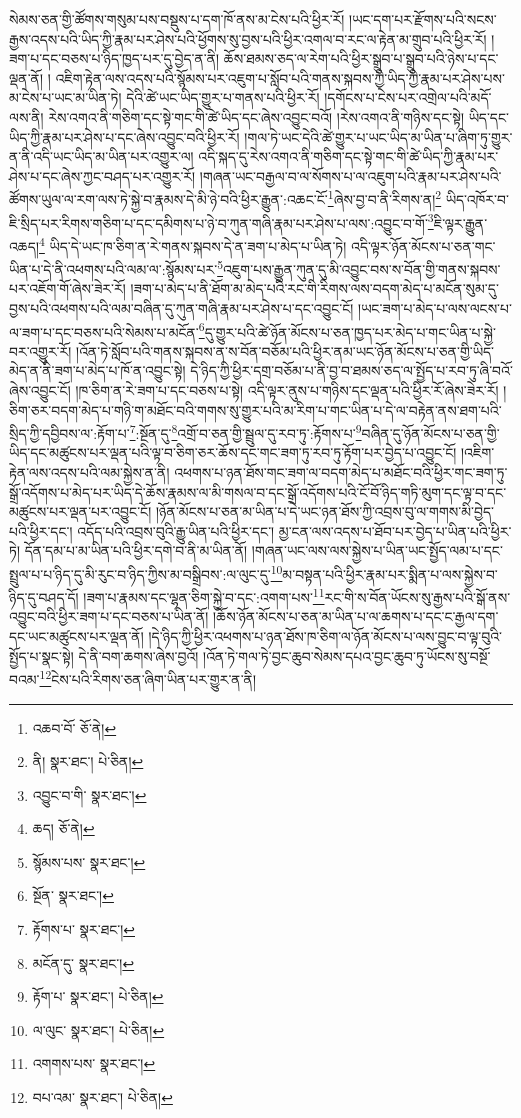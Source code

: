 སེམས་ཅན་གྱི་ཚོགས་གསུམ་པས་བསྡུས་པ་དག་ཁོ་ནས་མ་ངེས་པའི་ཕྱིར་རོ། །ཡང་དག་པར་རྫོགས་པའི་སངས་རྒྱས་འདས་པའི་ཡིད་ཀྱི་རྣམ་པར་ཤེས་པའི་ཕྱོགས་སུ་བྱས་པའི་ཕྱིར་འགལ་བ་རང་ལ་རྟེན་མ་གྲུབ་པའི་ཕྱིར་རོ། །ཟག་པ་དང་བཅས་པ་ཉིད་ཁྱད་པར་དུ་བྱེད་ན་ནི། ཆོས་ཐམས་ཅད་ལ་རེག་པའི་ཕྱིར་སྒྲུབ་པ་སྒྲུབ་པའི་ཉེས་པ་དང་ལྡན་ནོ། །
འཇིག་རྟེན་ལས་འདས་པའི་སྙོམས་པར་འཇུག་པ་སློབ་པའི་གནས་སྐབས་ཀྱི་ཡིད་ཀྱི་རྣམ་པར་ཤེས་པས་མ་ངེས་པ་ཡང་མ་ཡིན་ཏེ། དེའི་ཚེ་ཡང་ཡིད་གྱུར་པ་གནས་པའི་ཕྱིར་རོ། །དགོངས་པ་ངེས་པར་འགྲེལ་པའི་མདོ་ལས་ནི། རེས་འགའ་ནི་གཅིག་དང་སྟེ་གང་གི་ཚེ་ཡིད་དང་ཞེས་འབྱུང་བའོ། །རེས་འགའ་ནི་གཉིས་དང་སྟེ། ཡིད་དང་ཡིད་ཀྱི་རྣམ་པར་ཤེས་པ་དང་ཞེས་འབྱུང་བའི་ཕྱིར་རོ། །གལ་ཏེ་ཡང་དེའི་ཚེ་གྱུར་པ་ཡང་ཡིད་མ་ཡིན་པ་ཞིག་ཏུ་གྱུར་ན་ནི་འདི་ཡང་ཡིད་མ་ཡིན་པར་འགྱུར་ལ། འདི་སྐད་དུ་རེས་འགའ་ནི་གཅིག་དང་སྟེ་གང་གི་ཚེ་ཡིད་ཀྱི་རྣམ་པར་ཤེས་པ་དང་ཞེས་ཀྱང་བཤད་པར་འགྱུར་རོ། །གཞན་ཡང་བརྒྱལ་བ་ལ་སོགས་པ་ལ་འཇུག་པའི་རྣམ་པར་ཤེས་པའི་ཚོགས་ཡུལ་ལ་རག་ལས་ཏེ་སྐྱེ་བ་རྣམས་དེ་མི་ཉེ་བའི་ཕྱིར་རྒྱུན་:འཆང་ངོ་\footnote{འཆབ་བོ་  ཅོ་ནེ། }ཞེས་བྱ་བ་ནི་རིགས་ན།\footnote{ནི།  སྣར་ཐང་།  པེ་ཅིན། } ཡིད་འཁོར་བ་ཇི་སྲིད་པར་རིགས་གཅིག་པ་དང་དམིགས་པ་ཉེ་བ་ཀུན་གཞི་རྣམ་པར་ཤེས་པ་ལས་:འབྱུང་བ་གོ་\footnote{འབྱུང་བ་གི་  སྣར་ཐང་། }ཇི་ལྟར་རྒྱུན་འཆད།\footnote{ཆད།  ཅོ་ནེ། } ཡིད་དེ་ཡང་ཁ་ཅིག་ན་རེ་གནས་སྐབས་དེ་ན་ཟག་པ་མེད་པ་ཡིན་ཏེ། འདི་ལྟར་ཉོན་མོངས་པ་ཅན་གང་ཡིན་པ་དེ་ནི་འཕགས་པའི་ལམ་ལ་:སྙོམས་པར་\footnote{སྙོམས་པས་  སྣར་ཐང་། }འཇུག་པས་རྒྱུན་ཀུན་དུ་མི་འབྱུང་བས་ས་བོན་གྱི་གནས་སྐབས་པར་འཇོག་གོ་ཞེས་ཟེར་རོ། །ཟག་པ་མེད་པ་ནི་ཐོག་མ་མེད་པའི་རང་གི་རིགས་ལས་བདག་མེད་པ་མངོན་སུམ་དུ་བྱས་པའི་འཕགས་པའི་ལམ་བཞིན་དུ་ཀུན་གཞི་རྣམ་པར་ཤེས་པ་དང་འབྱུང་ངོ། །ཡང་ཟག་པ་མེད་པ་ལས་ལངས་པ་ལ་ཟག་པ་དང་བཅས་པའི་སེམས་པ་མངོན་\footnote{སྔོན་  སྣར་ཐང་། }དུ་གྱུར་པའི་ཚེ་ཉོན་མོངས་པ་ཅན་ཁྱད་པར་མེད་པ་གང་ཡིན་པ་སྐྱེ་བར་འགྱུར་རོ། །འོན་ཏེ་སློབ་པའི་གནས་སྐབས་ན་ས་བོན་བཅོམ་པའི་ཕྱིར་ནམ་ཡང་ཉོན་མོངས་པ་ཅན་གྱི་ཡིད་མེད་ན་ནི་ཟག་པ་མེད་པ་ཁོ་ན་འབྱུང་སྟེ། དེ་ཉིད་ཀྱི་ཕྱིར་དགྲ་བཅོམ་པ་ནི་བྱ་བ་ཐམས་ཅད་ལ་སྤྱོད་པ་རབ་ཏུ་ཞི་བའོ་ཞེས་འབྱུང་ངོ། །ཁ་ཅིག་ན་རེ་ཟག་པ་དང་བཅས་པ་སྟེ། འདི་ལྟར་ནུས་པ་གཉིས་དང་ལྡན་པའི་ཕྱིར་རོ་ཞེས་ཟེར་རོ། །ཅིག་ཅར་བདག་མེད་པ་གཉི་ག་མཐོང་བའི་གགས་སུ་གྱུར་པའི་མ་རིག་པ་གང་ཡིན་པ་དེ་ལ་བརྟེན་ནས་ཐག་པའི་སྲིད་ཀྱི་དབྱིབས་ལ་:རྟོག་པ་\footnote{རྟོགས་པ་  སྣར་ཐང་། }:སྔོན་དུ་\footnote{མངོན་དུ་  སྣར་ཐང་། }འགྲོ་བ་ཅན་གྱི་སྦྲུལ་དུ་རབ་ཏུ་:རྟོགས་པ་\footnote{རྟོག་པ་  སྣར་ཐང་།  པེ་ཅིན། }བཞིན་དུ་ཉོན་མོངས་པ་ཅན་གྱི་ཡིད་དང་མཚུངས་པར་ལྡན་པའི་ལྟ་བ་ཅིག་ཅར་ཆོས་དང་གང་ཟག་ཏུ་རབ་ཏུ་རྟོག་པར་བྱེད་པ་འབྱུང་ངོ། །འཇིག་རྟེན་ལས་འདས་པའི་ལམ་སྐྱེས་ན་ནི། འཕགས་པ་ཉན་ཐོས་གང་ཟག་ལ་བདག་མེད་པ་མཐོང་བའི་ཕྱིར་གང་ཟག་ཏུ་སྒྲོ་འདོགས་པ་མེད་པར་ཡིད་དེ་ཆོས་རྣམས་ལ་མི་གསལ་བ་དང་སྒྲོ་འདོགས་པའི་ངོ་བོ་ཉིད་གཏི་མུག་དང་ལྟ་བ་དང་མཚུངས་པར་ལྡན་པར་འབྱུང་ངོ། །ཉོན་མོངས་པ་ཅན་མ་ཡིན་པ་དེ་ཡང་ཉན་ཐོས་ཀྱི་འབྲས་བུ་ལ་གགས་མི་བྱེད་པའི་ཕྱིར་དང་། འདོད་པའི་འབྲས་བུའི་རྒྱུ་ཡིན་པའི་ཕྱིར་དང་། མྱ་ངན་ལས་འདས་པ་ཐོབ་པར་བྱེད་པ་ཡིན་པའི་ཕྱིར་ཏེ། དོན་དམ་པ་མ་ཡིན་པའི་ཕྱིར་དགེ་བ་ནི་མ་ཡིན་ནོ། །གཞན་ཡང་ལས་ལས་སྐྱེས་པ་ཡིན་ཡང་སྤྱོད་ལམ་པ་དང་སྤྲུལ་པ་པ་ཉིད་དུ་མི་རུང་བ་ཉིད་ཀྱིས་མ་བསྒྲིབས་:ལ་ལུང་དུ་\footnote{ལ་ལུང་  སྣར་ཐང་།  པེ་ཅིན། }མ་བསྟན་པའི་ཕྱིར་རྣམ་པར་སྨིན་པ་ལས་སྐྱེས་བ་ཉིད་དུ་བཤད་དོ། །ཟག་པ་རྣམས་དང་ལྷན་ཅིག་སྐྱེ་བ་དང་:འགག་པས་\footnote{འགགས་པས་  སྣར་ཐང་། }རང་གི་ས་བོན་ཡོངས་སུ་རྒྱས་པའི་སྒོ་ནས་འབྱུང་བའི་ཕྱིར་ཟག་པ་དང་བཅས་པ་ཡིན་ནོ། །ཆོས་ཉོན་མོངས་པ་ཅན་མ་ཡིན་པ་ལ་ཆགས་པ་དང་ང་རྒྱལ་དག་དང་ཡང་མཚུངས་པར་ལྡན་ནོ། །དེ་ཉིད་ཀྱི་ཕྱིར་འཕགས་པ་ཉན་ཐོས་ཁ་ཅིག་ལ་ཉོན་མོངས་པ་ལས་བྱུང་བ་ལྟ་བུའི་སྤྱོད་པ་སྣང་སྟེ། དེ་ནི་བག་ཆགས་ཞེས་བྱའོ། །འོན་ཏེ་གལ་ཏེ་བྱང་ཆུབ་སེམས་དཔའ་བྱང་ཆུབ་ཏུ་ཡོངས་སུ་བསྔོ་བའམ་\footnote{བཔ་འམ་  སྣར་ཐང་།  པེ་ཅིན། }ངེས་པའི་རིགས་ཅན་ཞིག་ཡིན་པར་གྱུར་ན་ནི། 